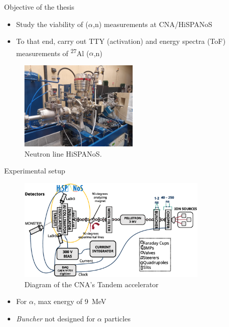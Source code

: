 \documentclass[11pt]{beamer}
\newcommand{\an}{($\alpha$,n) }
\newcommand{\Aliso}{\textsuperscript{27}Al }
\begin{document}
\begin{frame}{Objective of the thesis}
	\begin{itemize}
		\item Study the viability of \an measurements at CNA/HiSPANoS
		\item To that end, carry out TTY (activation) and energy spectra (ToF) measurements of \Aliso\an
	\end{itemize}
	\begin{figure}[H]
		\centering
		\includegraphics[width=0.50\textwidth]{neutronline_foto.jpg}
		\caption{Neutron line HiSPANoS.}
		\label{}
	\end{figure}
\end{frame}

\begin{frame}{Experimental setup}
	\begin{figure}[H]
		\centering
		\includegraphics[width=0.80\textwidth]{tandemdiagrama.eps}
		\caption{Diagram of the CNA's Tandem accelerator}
		\label{}
	\end{figure}
	\begin{itemize}
		\item For $\alpha$, max energy of \qty{9}{\MeV}
		\item \textit{Buncher} not designed for $\alpha$ particles
	\end{itemize}
\end{frame}
\end{document}

